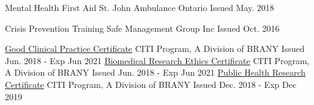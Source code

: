 


\begin{cventries}
  \cventry
    {Mental Health First Aid} %
    {St. John Ambulance Ontario} %
    {} %
    {Issued May. 2018} %
    {}

  \cventry
    {Crisis Prevention Training} %
    {Safe Management Group Inc} %
    {} %
    {Issued Oct. 2016} %
    {}
    
  \cventry
    {\href{https://www.citiprogram.org/verify/?we6cda586-d079-4640-b913-ec258dd3f762-24020608}{Good Clinical Practice Certificate}} %
    {CITI Program, A Division of BRANY} %
    {} %
    {Issued Jun. 2018 - Exp Jun 2021} %
    {}
  \cventry
    {\href{https://www.citiprogram.org/verify/?w481edb45-6889-419b-8457-cea47b3378da-24020610}{Biomedical Research Ethics Certificate}} %
    {CITI Program, A Division of BRANY} %
    {} %
    {Issued Jun. 2018 - Exp Jun 2021} %
    {}
  \cventry
    {\href{https://www.citiprogram.org/verify/?wf04ccaf2-a07e-4fb9-9998-510b28015d27-27756237}{Public Health Research Certificate}} %
    {CITI Program, A Division of BRANY} %
    {} %
    {Issued Dec. 2018 - Exp Dec 2019} %
    {}
\end{cventries}


